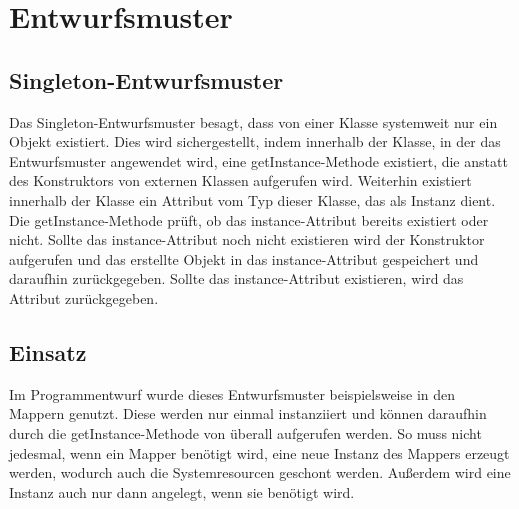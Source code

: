 \chapter{Entwurfsmuster}
\section{Singleton-Entwurfsmuster}
Das Singleton-Entwurfsmuster besagt, dass von einer Klasse systemweit nur ein Objekt existiert. Dies wird sichergestellt, indem innerhalb der Klasse, in der das Entwurfsmuster angewendet wird, 
eine getInstance-Methode existiert, die anstatt des Konstruktors von externen Klassen aufgerufen wird. Weiterhin existiert innerhalb der Klasse ein Attribut vom Typ dieser Klasse, das als Instanz dient. 
Die getInstance-Methode prüft, ob das instance-Attribut bereits existiert oder nicht. Sollte das instance-Attribut noch nicht existieren wird der Konstruktor aufgerufen und das erstellte Objekt 
in das instance-Attribut gespeichert und daraufhin zurückgegeben. Sollte das instance-Attribut existieren, wird das Attribut zurückgegeben.
\section{Einsatz}
Im Programmentwurf wurde dieses Entwurfsmuster beispielsweise in den Mappern genutzt. Diese werden nur einmal instanziiert und können daraufhin durch die getInstance-Methode von überall 
aufgerufen werden. So muss nicht jedesmal, wenn ein Mapper benötigt wird, eine neue Instanz des Mappers erzeugt werden, wodurch auch die Systemresourcen geschont werden. Außerdem wird eine Instanz auch nur dann angelegt, wenn sie benötigt wird.
\newpage
